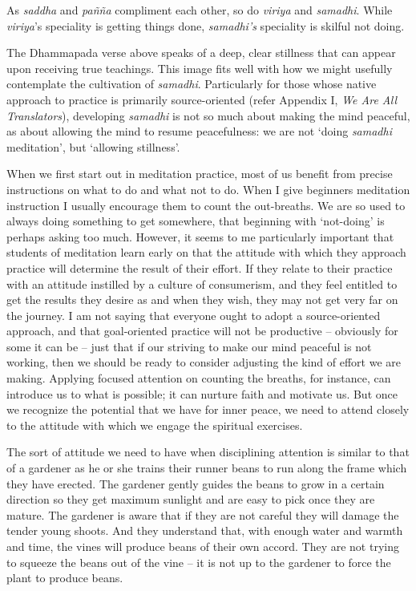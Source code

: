 As \emph{saddha} and \emph{pañña} compliment each other, so do \emph{viriya} and
\emph{samadhi}. While \emph{viriya}'s speciality is getting things done,
\emph{samadhi's} speciality is skilful not doing.

The Dhammapada verse above speaks of a deep, clear stillness that can
appear upon receiving true teachings. This image fits well with how we
might usefully contemplate the cultivation of \emph{samadhi}. Particularly
for those whose native approach to practice is primarily source-oriented (refer Appendix I, \emph{We Are All Translators}), developing \emph{samadhi} is
not so much about making the mind peaceful, as about allowing the mind
to resume peacefulness: we are not `doing \emph{samadhi} meditation', but
`allowing stillness'.

When we first start out in meditation practice, most of us benefit from
precise instructions on what to do and what not to do. When I give
beginners meditation instruction I usually encourage them to count the
out-breaths. We are so used to always doing something to get somewhere,
that beginning with `not-doing' is perhaps asking too much. However, it
seems to me particularly important that students of meditation learn
early on that the attitude with which they approach practice will
determine the result of their effort. If they relate to their practice
with an attitude instilled by a culture of consumerism, and they feel
entitled to get the results they desire as and when they wish, they may
not get very far on the journey. I am not saying that everyone ought to
adopt a source-oriented approach, and that goal-oriented practice will
not be productive -- obviously for some it can be -- just that if our
striving to make our mind peaceful is not working, then we should be
ready to consider adjusting the kind of effort we are making. Applying
focused attention on counting the breaths, for instance, can introduce
us to what is possible; it can nurture faith and motivate us. But once
we recognize the potential that we have for inner peace, we need to
attend closely to the attitude with which we engage the spiritual
exercises.

The sort of attitude we need to have when disciplining attention is
similar to that of a gardener as he or she trains their runner
beans\cite{beans} to run along the frame which they have
erected. The gardener gently guides the beans to grow in a certain
direction so they get maximum sunlight and are easy to pick once they
are mature. The gardener is aware that if they are not careful they will
damage the tender young shoots. And they understand that, with enough
water and warmth and time, the vines will produce beans of their own
accord. They are not trying to squeeze the beans out of the vine -- it is
not up to the gardener to force the plant to produce beans.

